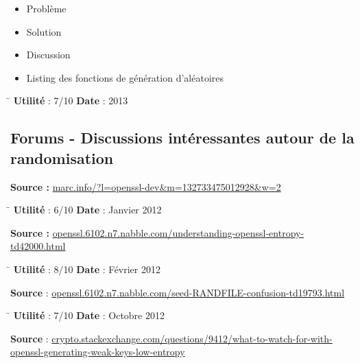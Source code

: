 \documentclass{article}
\begin{document}
		\begin{itemize}
			\item Problème
			\item Solution
			\item Discussion
			\item Listing des fonctions de génération d'aléatoires
		\end{itemize}

	\begin{tabbing}
		\hspace{10cm}\=\kill
		\textbf{Utilité} : 7/10 \>	\textbf{Date} : 2013\\
	\end{tabbing}
	
	\subsection{Forums - Discussions intéressantes autour de la randomisation}

		\textbf{Source : } \href{http://marc.info/?l=openssl-dev\&m=132733475012928\&w=2}
		{marc.info/?l=openssl-dev\&m=132733475012928\&w=2}
		
		\begin{tabbing}
			\hspace{10cm}\=\kill
			\textbf{Utilité} : 6/10 \>	\textbf{Date} : Janvier 2012\\
		\end{tabbing}

		\textbf{Source : } \href{http://openssl.6102.n7.nabble.com/understanding-openssl-entropy-td42000.html}
		{openssl.6102.n7.nabble.com/understanding-openssl-entropy-td42000.html}
		
		\begin{tabbing}
			\hspace{10cm}\=\kill
			\textbf{Utilité} : 8/10 \>	\textbf{Date} : Février 2012\\
		\end{tabbing}

		\textbf{Source} : \href{http://openssl.6102.n7.nabble.com/seed-RANDFILE-confusion-td19793.html}
		{openssl.6102.n7.nabble.com/seed-RANDFILE-confusion-td19793.html}
	
		\begin{tabbing}
			\hspace{10cm}\=\kill
			\textbf{Utilité} : 7/10 \>	\textbf{Date} : Octobre 2012\\
		\end{tabbing}

		\textbf{Source} : \href{http://crypto.stackexchange.com/questions/9412/what-to-watch-for-with-openssl-generating-weak-keys-low-entropy}
		{crypto.stackexchange.com/questions/9412/what-to-watch-for-with-openssl-generating-weak-keys-low-entropy}
		
\end{document}
